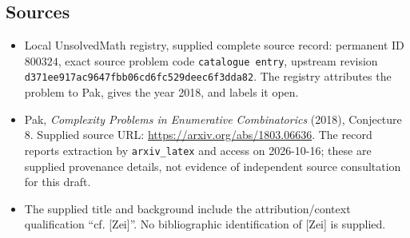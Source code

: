 \documentclass[11pt]{article}
\begin{document}
\subsection{Sources}
\begin{itemize}
\item Local UnsolvedMath registry, supplied complete source record: permanent ID \(800324\), exact source problem code \texttt{catalogue entry}, upstream revision \texttt{d371ee917ac9647fbb06cd6fc529deec6f3dda82}. The registry attributes the problem to Pak, gives the year 2018, and labels it open.
\item Pak, \emph{Complexity Problems in Enumerative Combinatorics} (2018), Conjecture 8. Supplied source URL: \url{https://arxiv.org/abs/1803.06636}. The record reports extraction by \texttt{arxiv\_latex} and access on 2026-10-16; these are supplied provenance details, not evidence of independent source consultation for this draft.
\item The supplied title and background include the attribution/context qualification ``cf. [Zei]''. No bibliographic identification of [Zei] is supplied.
\end{itemize}
\end{document}
